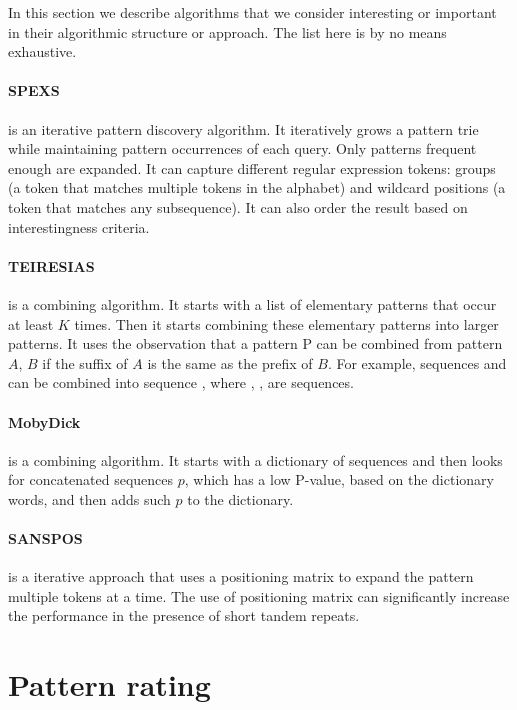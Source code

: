 In this section we describe algorithms that we consider interesting or important in their algorithmic structure or approach. The list here is by no means exhaustive.

\paragraph{SPEXS \cite{spexs}} is an iterative pattern discovery algorithm. It iteratively grows a pattern trie while maintaining pattern occurrences of each query. Only patterns frequent enough are expanded. It can capture different regular expression tokens: groups (a token that matches multiple tokens in the alphabet) and wildcard positions (a token that matches any subsequence). It can also order the result based on interestingness criteria.

\paragraph{TEIRESIAS \cite{TEIRESIAS}} is a combining algorithm. It starts with a list of elementary patterns that occur at least $K$ times. Then it starts combining these elementary patterns into larger patterns. It uses the observation that a pattern P can be combined from pattern $A$, $B$ if the suffix of $A$ is the same as the prefix of $B$. For example, sequences \R{$\alpha\Delta$} and \R{$\Delta\beta$}can be combined into sequence \R{$\alpha\Delta\beta$}, where \R{$\alpha$}, \R{$\Delta$}, \R{$\beta$} are sequences.

\paragraph{MobyDick \cite{MobyDick}} is a combining algorithm. It starts with a dictionary of sequences and then looks for concatenated sequences $p$, which has a low P-value, based on the dictionary words, and then adds such $p$ to the dictionary.

\paragraph{SANSPOS \cite{NewDataStructures}} is a iterative approach that uses a positioning matrix to expand the pattern multiple tokens at a time. The use of positioning matrix can significantly increase the performance in the presence of short tandem repeats.

\section{Pattern rating}

